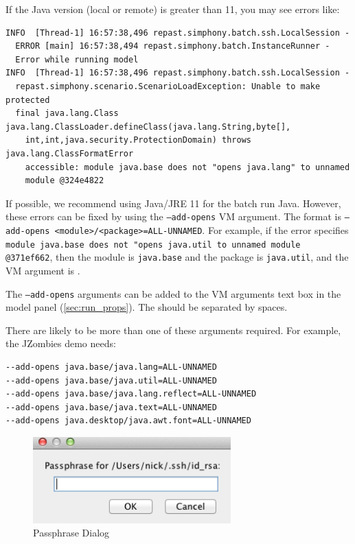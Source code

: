 \documentclass[11pt]{amsart}
\begin{document}
If the Java version (local or remote) is greater than 11, you may see errors like:

\begin{verbatim}
INFO  [Thread-1] 16:57:38,496 repast.simphony.batch.ssh.LocalSession - 
  ERROR [main] 16:57:38,494 repast.simphony.batch.InstanceRunner - 
  Error while running model
INFO  [Thread-1] 16:57:38,496 repast.simphony.batch.ssh.LocalSession - 
  repast.simphony.scenario.ScenarioLoadException: Unable to make protected 
  final java.lang.Class java.lang.ClassLoader.defineClass(java.lang.String,byte[],
    int,int,java.security.ProtectionDomain) throws java.lang.ClassFormatError 
    accessible: module java.base does not "opens java.lang" to unnamed 
    module @324e4822
\end{verbatim}

If possible, we recommend using Java/JRE 11 for the batch run Java.
However, these errors can be fixed by using the {\tt--add-opens} VM argument. 
\linebreak The format is {\tt --add-opens <module>/<package>=ALL-UNNAMED}. For example,
if the error specifies {\tt module java.base does not "opens java.util to unnamed module @371ef662}, 
then the module is {\tt java.base} and the package is {\tt java.util}, and the VM argument is .

The {\tt --add-opens} arguments can be added to the VM arguments text box in the
model panel (\ref{sec:run_props}). The should be separated by spaces.

There are likely to be more than one of these arguments required. For example,
the JZombies demo needs:

\begin{verbatim}
--add-opens java.base/java.lang=ALL-UNNAMED
--add-opens java.base/java.util=ALL-UNNAMED
--add-opens java.base/java.lang.reflect=ALL-UNNAMED
--add-opens java.base/java.text=ALL-UNNAMED
--add-opens java.desktop/java.awt.font=ALL-UNNAMED
\end{verbatim}

\begin{figure}[h]
\begin{center}
\vspace{.2in}
\centerline {
\includegraphics[width=3in]{images/passphrase.png}
}
\caption{Passphrase Dialog}
\label{fig:passphrase}
\end{center}
\end{figure}
\end{document}
